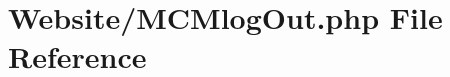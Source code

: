 \hypertarget{_m_c_mlog_out_8php}{\section{Website/\-M\-C\-Mlog\-Out.php File Reference}
\label{_m_c_mlog_out_8php}
}
